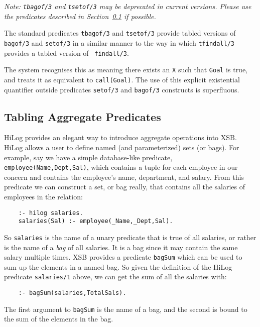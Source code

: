 \begin{description}

    {\em Note: {\tt tbagof/3} and {\tt tsetof/3} may be deprecated in
    current versions.  Please use the predicates described in
    Section~\ref{tabling_aggregate_predicates} if possible.}

The standard predicates {\tt tbagof/3} and {\tt tsetof/3} provide
tabled versions of {\tt bagof/3} and {\tt setof/3} in a similar manner
to the way in which {\tt tfindall/3} provides a tabled version of {\tt
findall/3}.

    The system recognises this as meaning there exists an {\tt X} such
    that {\tt Goal} is true, and treats it as equivalent to {\tt call(Goal)}.
    The use of this explicit existential quantifier outside predicates
    {\tt setof/3} and {\tt bagof/3} constructs is superfluous.
\end{description}

\subsection{Tabling Aggregate Predicates}\label{tabling_aggregate_predicates}
 

HiLog provides an elegant way to introduce aggregate operations into
XSB.  HiLog allows a user to define named (and parameterized) sets (or
bags).  For example, say we have a simple database-like predicate,
\verb|employee(Name,Dept,Sal)|, which contains a tuple for each
employee in our concern and contains the employee's name, department,
and salary.  From this predicate we can construct a set, or bag
really, that contains all the salaries of employees in the relation:
\begin{verbatim}
    :- hilog salaries.
    salaries(Sal) :- employee(_Name,_Dept,Sal).
\end{verbatim}
So \verb|salaries| is the name of a unary predicate that is true of
all salaries, or rather is the name of a {\em bag} of all salaries.
It is a bag since it may contain the same salary multiple times.
XSB provides a predicate \verb|bagSum| which can be used to
sum up the elements in a named bag.  So given the definition of the
HiLog predicate \verb|salaries/1| above, we can get the sum of all the
salaries with:
\begin{verbatim}
    :- bagSum(salaries,TotalSals).
\end{verbatim}
The first argument to \verb|bagSum| is the name of a bag, and the
second is bound to the sum of the elements in the bag.

